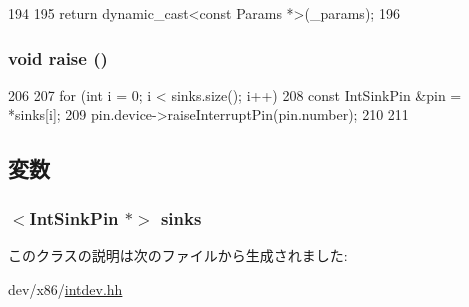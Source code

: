 \begin{DoxyCode}
194     {
195         return dynamic_cast<const Params *>(_params);
196     }
\end{DoxyCode}
\hypertarget{classX86ISA_1_1IntSourcePin_ad9c27f2d106edb222bc33c4bfc384f58}{
\subsubsection[{raise}]{\setlength{\rightskip}{0pt plus 5cm}void raise ()}}
\label{classX86ISA_1_1IntSourcePin_ad9c27f2d106edb222bc33c4bfc384f58}



\begin{DoxyCode}
206     {
207         for (int i = 0; i < sinks.size(); i++) {
208             const IntSinkPin &pin = *sinks[i];
209             pin.device->raiseInterruptPin(pin.number);
210         }
211     }
\end{DoxyCode}


\subsection{変数}
\hypertarget{classX86ISA_1_1IntSourcePin_a90a62b49a8d8eddd12ecfc48b5ae3cac}{
\subsubsection[{sinks}]{$<${\bf IntSinkPin} $\ast$$>$ {\bf sinks}}}
\label{classX86ISA_1_1IntSourcePin_a90a62b49a8d8eddd12ecfc48b5ae3cac}


このクラスの説明は次のファイルから生成されました:\begin{DoxyCompactItemize}
\item 
dev/x86/\hyperlink{intdev_8hh}{intdev.hh}\end{DoxyCompactItemize}
